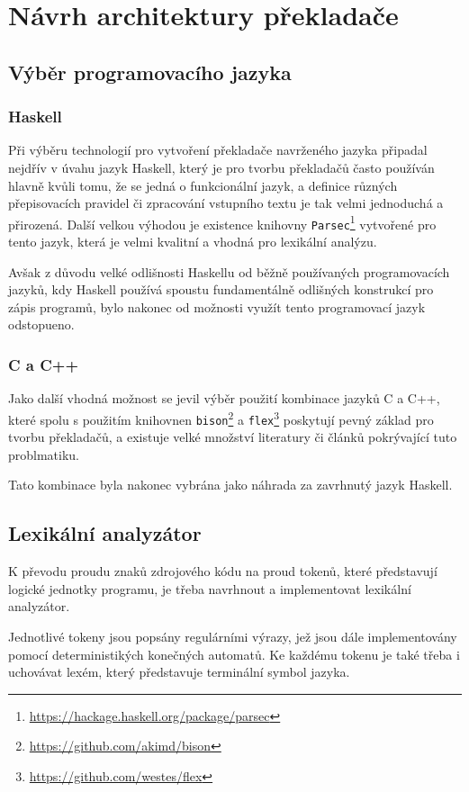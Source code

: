 \documentclass[12pt, a4paper]{article}
\let\oldsection\section
\renewcommand\section{\clearpage\oldsection}
\begin{document}
\section{Návrh architektury překladače}

\subsection{Výběr programovacího jazyka}
\subsubsection{Haskell}
Při výběru technologií pro vytvoření překladače navrženého jazyka připadal nejdřív v úvahu jazyk Haskell, který je pro tvorbu překladačů často používán hlavně kvůli tomu, že se jedná o funkcionální jazyk, a definice různých přepisovacích pravidel či zpracování vstupního textu je tak velmi jednoduchá a přirozená. Další velkou výhodou je existence knihovny \texttt{Parsec}\footnote{\url{https://hackage.haskell.org/package/parsec}} vytvořené pro tento jazyk, která je velmi kvalitní a vhodná pro lexikální analýzu.

 Avšak z důvodu velké odlišnosti Haskellu od běžně používaných programovacích jazyků, kdy Haskell používá spoustu fundamentálně odlišných konstrukcí pro zápis programů, bylo nakonec od možnosti využít tento programovací jazyk odstopueno.
 
\subsubsection{C a C++}
Jako další vhodná možnost se jevil výběr použití kombinace jazyků C a C++, které spolu s použitím knihovnen \texttt{bison}\footnote{\url{https://github.com/akimd/bison}} a \texttt{flex}\footnote{\url{https://github.com/westes/flex}} poskytují pevný základ pro tvorbu překladačů, a existuje velké množství literatury či článků pokrývající tuto problmatiku.

Tato kombinace byla nakonec vybrána jako náhrada za zavrhnutý jazyk Haskell.


\subsection{Lexikální analyzátor}

K převodu proudu znaků zdrojového kódu na proud tokenů, které představují logické jednotky programu, je třeba navrhnout a implementovat lexikální analyzátor. 

Jednotlivé tokeny jsou popsány regulárními výrazy, jež jsou dále implementovány pomocí deterministikých konečných automatů. Ke každému tokenu je také třeba i uchovávat lexém, který představuje terminální symbol jazyka.
\end{document}
